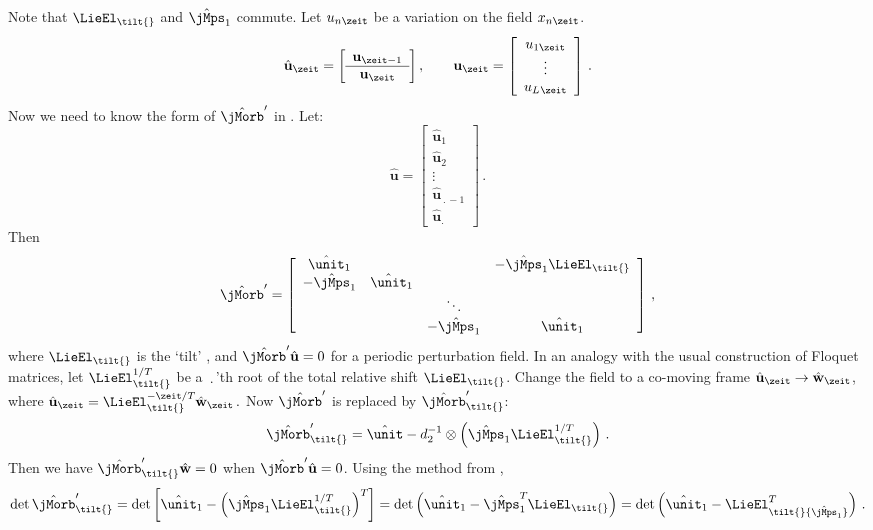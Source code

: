 Note that $\mathbf{\LieEl}_\tilt{}$ and $\hat{\mathbf{\jMps}}_1$ commute.
Let $u_{n\zeit}$ be a variation on the field $\ssp_{n\zeit}$.
\[
\hat{\mathbf{u}}_\zeit
=
\left[\begin{array}{c}
 {\mathbf{u}}_{\zeit-1}\\ \hline
 {\mathbf{u}}_\zeit
 \end{array}\right]
 ,\qquad
\mathbf{u}_\zeit
=
\left[\begin{array}{c}
 u_{1\zeit}\\   \vdots\\ u_{\speriod{}\zeit}
 \end{array}\right] \,.
\]
Now we need to know the form of $\hat{\mathbf{\jMorb}}'$ in . Let:
\[
\hat{\mathbf{u}} =
\left[\begin{array}{c}
 \hat{\mathbf{u}}_{1} \\ \hline
 \hat{\mathbf{u}}_{2}\\ \hline
 \vdots \\ \hline
 \hat{\mathbf{u}}_{\period{}-1} \\ \hline
 \hat{\mathbf{u}}_{\period{}}
 \end{array}\right] \, .
\]
Then
\[
\hat{\mathbf{\jMorb}}' =
\left[\begin{array}{cccc}
 \hat{\unit}_1    &   &     &-{\hat{\mathbf{\jMps}}_1} \mathbf{\LieEl}_\tilt{} \\
-{\hat{\mathbf{\jMps}}_1} &  \hat{\unit}_1   & &  \\
     &  & \ddots    &     \\
     &  &-{\hat{\mathbf{\jMps}}_1} & \hat{\unit}_1
\end{array}\right] \, ,
\]
where $\mathbf{\LieEl}_\tilt{}$ is the `tilt' , and
$\hat{\mathbf{\jMorb}}' \hat{\mathbf{u}} = 0$ for a periodic perturbation
field. In an analogy with the usual construction of Floquet matrices, let
$\mathbf{\LieEl}^{1/\period{}}_\tilt{}$ be a $\period{}$'th root of the total
relative shift $\mathbf{\LieEl}_\tilt{}$.
Change the field to a co-moving frame
$\hat{\mathbf{u}}_\zeit \to \hat{\mathbf{w}}_\zeit$,
where
\(
\hat{\mathbf{u}}_\zeit
=\mathbf{\LieEl}^{-\zeit/\period{}}_\tilt{}\hat{\mathbf{w}}_\zeit
\,.
\)
Now $\hat{\mathbf{\jMorb}}'$ is replaced by
$\hat{\mathbf{\jMorb}}_{\tilt{}}'$:
\[
\hat{\mathbf{\jMorb}}_{\tilt{}}' =
\hat{\unit}-\shift_2^{-1} \otimes
       \left(
\hat{\mathbf{\jMps}}_1\mathbf{\LieEl}^{1/\period{}}_\tilt{}
       \right)
\,.
\]
Then we have $\hat{\mathbf{\jMorb}}_{\tilt{}}' \hat{\mathbf{w}} = 0$
when $\hat{\mathbf{\jMorb}}' \hat{\mathbf{u}} = 0$. Using the method from
,
\[
\det \hat{\mathbf{\jMorb}}_{\tilt{}}'
= \det \left[ \hat{\unit}_{1} -
            \left(
\hat{\mathbf{\jMps}}_1\mathbf{\LieEl}^{1/\period{}}_\tilt{}
            \right)^{\period{}}
        \right]
=  \det \left( \hat{\unit}_{1} - {\hat{\mathbf{\jMps}}_1}^{\period{}} \mathbf{\LieEl}_\tilt{} \right)
=  \det \left( \hat{\unit}_{1} - \mathbf{\LieEl}_\tilt{} {\hat{\mathbf{\jMps}}_1}^{\period{}} \right)
\, .
\]

